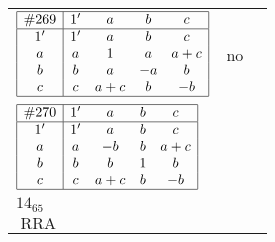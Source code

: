 \documentclass[12pt]{article}
\theoremstyle{definition}
\newcommand\RRA{\operatorname{RRA}}
\newcommand{\join}{\mathbin{+}}%
\newcommand{\id}{{1'}}%
\renewcommand{\top}{1}%
\begin{document}
\begin{center}
\begin{longtable}{l|c|c}
$
\begin{array}{|c|cccc|} \hline
\#269 & \id & a & b & c \\ \hline
\id & \id & a & b & c \\
a & a & \top & a & a \join c \\
b & b & a & -a & b \\
c & c & a \join c & b & -b \\ \hline
\end{array}
$
 & no  
 & \adjustbox{valign=c, max height=1.6cm}{$
\left[ \begin{array}{cccccccc}
\id & a & a & b & c & a & b & c \\ 
a & \id & a & a & a & c & a & a \\ 
a & a & \id & a & a & c & a & a \\ 
b & a & a & \id & b & a & b & b \\ 
c & a & a & b & \id & a & b & c \\ 
a & c & c & a & a & \id & a & a \\ 
b & a & a & b & b & a & \id & b \\ 
c & a & a & b & c & a & b & \id
\end{array}\right]
$}     \\[15mm]

$
\begin{array}{|c|cccc|} \hline
\#270 & \id & a & b & c \\ \hline
\id & \id & a & b & c \\
a & a & -b & b & a \join c \\
b & b & b & \top & b \\
c & c & a \join c & b & -b \\ \hline
\end{array}
$
 & \begin{tabular}{c} yes \\ $14_{65}$ \\ $\RRA$ \end{tabular} 
 & \adjustbox{valign=c, max height=1.6cm}{$
\left[ \begin{array}{ccccccc}
\id & a & a & c & b & b & c \\ 
a & \id & a & a & b & b & c \\ 
a & a & \id & c & b & b & c \\ 
c & a & c & \id & b & b & c \\ 
b & b & b & b & \id & b & b \\ 
b & b & b & b & b & \id & b \\ 
c & c & c & c & b & b & \id
\end{array}\right]
$}      \\[15mm]


\end{longtable}
\end{center}
\end{document}
